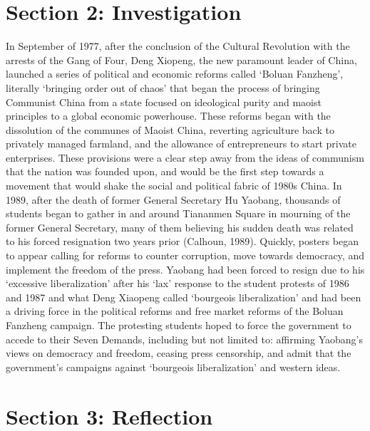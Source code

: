 \documentclass[letterpaper, 12pt]{article}
\begin{document}
\section{Section 2: Investigation}
In September of 1977, after the conclusion of the Cultural Revolution with the arrests of the Gang of Four, Deng Xiopeng, the new paramount leader of China, launched a series of political and economic reforms called ‘Boluan Fanzheng’, literally ‘bringing order out of chaos’ that began the process of bringing Communist China from a state focused on ideological purity and maoist principles to a global economic powerhouse. These reforms began with the dissolution of the communes of Maoist China, reverting agriculture back to privately managed farmland, and the allowance of entrepreneurs to start private enterprises. These provisions were a clear step away from the ideas of communism that the nation was founded upon, and would be the first step towards a movement that would shake the social and political fabric of 1980s China.
In 1989, after the death of former General Secretary Hu Yaobang, thousands of students began to gather in and around Tiananmen Square in mourning of the former General Secretary, many of them believing his sudden death was related to his forced resignation two years prior (Calhoun, 1989). Quickly, posters began to appear calling for reforms to counter corruption, move towards democracy, and implement the freedom of the press. Yaobang had been forced to resign due to his ‘excessive liberalization’ after his ‘lax’ response to the student protests of 1986 and 1987 and what Deng Xiaopeng called ‘bourgeois liberalization’ and had been a driving force in the political reforms and free market reforms of the Boluan Fanzheng campaign. The protesting students hoped to force the government to accede to their Seven Demands, including but not limited to: affirming Yaobang’s views on democracy and freedom, ceasing press censorship, and admit that the government’s campaigns against ‘bourgeois liberalization’ and western ideas.

\section{Section 3: Reflection}
\end{document}
